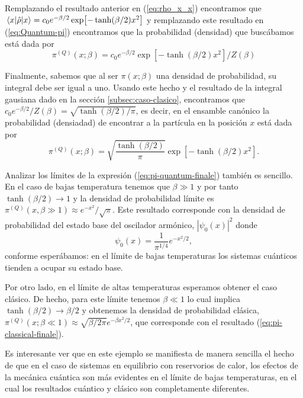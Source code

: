 \documentclass[%
 reprint,
 amsmath,amssymb,
 aps,
 pra,
]{revtex4-2}
\begin{document}
Remplazando el resultado anterior en  (\ref{eq:rho_x_x}) encontramos que $\ev{\hat{\rho}}{x}= c_0e^{-\beta/2}\exp[-\tanh(\beta/2)x^2]$ y remplazando este resultado en (\ref{eq:Quantum-pi}) encontramos que la probabilidad (densidad) que buscábamos está dada por
\begin{equation}
	\pi^{(Q)}(x;\beta) = c_0e^{-\beta/2}\exp[-\tanh(\beta/2)x^2]/Z(\beta)
\end{equation}

Finalmente, sabemos que al ser $\pi(x;\beta)$ una densidad de probabilidad, su integral debe ser igual a uno. Usando este hecho y el resultado de la integral gausiana dado en la sección \ref{subsec:caso-clasico}, encontramos que $c_0 e^{-\beta/2}/Z(\beta)=\sqrt{\tanh(\beta/2)/\pi}$, es decir, en el ensamble canónico la probabilidad (densiadad) de encontrar a la partícula en la posición $x$ está dada por
\begin{equation}
	\pi^{(Q)}(x;\beta) = \sqrt{\frac{\tanh(\beta/2)}{\pi}}\exp[-\tanh(\beta/2)x^2]. \label{eq:pi-quantum-finale}
\end{equation}


Analizar los límites de la expresión (\ref{eq:pi-quantum-finale}) también es sencillo. En el caso de bajas temperatura tenemos que $\beta \gg 1$ y por tanto $\tanh(\beta/2)\rightarrow 1$ y la densidad de probabilidad límite es $\pi^{(Q)}(x,\beta\gg 1) \approx e^{-x^2}/\sqrt{\pi}$. Este resultado corresponde con la densidad de probabilidad del estado base del oscilador armónico, $|\psi_0(x)|^2$  donde 
\begin{equation}
	\psi_0(x) = \frac{1}{\pi^{1/4}} e^{-x^2/2},	\label{eq:QHO-ground-state}
\end{equation}
conforme esperábamos: en el límite de bajas temperaturas los sistemas cuánticos tienden a ocupar su estado base.

Por otro lado, en el límite de altas temperaturas esperamos obtener el caso clásico. De hecho, para este límite tenemos $\beta \ll 1$ lo cual implica $\tanh(\beta/2)\rightarrow\beta/2$ y obtenemos la densidad de probabilidad clásica, $\pi^{(Q)}(x;\beta \ll 1) \approx \sqrt{\beta/2\pi}e^{-\beta x^2/2}$, que corresponde con el resultado (\ref{eq:pi-classical-finale}).

Es interesante ver que en este ejemplo se manifiesta de manera sencilla el hecho de que en el caso de sistemas en equilibrio con reservorios de calor, los efectos de la mecánica cuántica son más evidentes en el límite de bajas temperaturas, en el cual los resultados cuántico y clásico son completamente diferentes.
\linebreak
\end{document}
